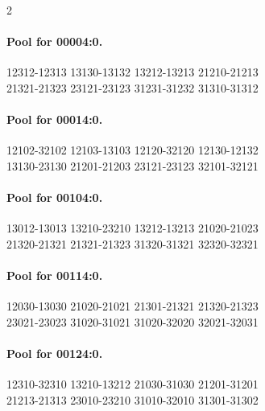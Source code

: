 \begin{multicols}{2}
\paragraph{Pool for 00004:0.}
\begingroup\footnotesize\ttfamily\begin{flushleft}
12312-12313 13130-13132 13212-13213 21210-21213\\
21321-21323 23121-23123 31231-31232 31310-31312\\
\end{flushleft}\endgroup
\paragraph{Pool for 00014:0.}
\begingroup\footnotesize\ttfamily\begin{flushleft}
12102-32102 12103-13103 12120-32120 12130-12132\\
13130-23130 21201-21203 23121-23123 32101-32121\\
\end{flushleft}\endgroup
\paragraph{Pool for 00104:0.}
\begingroup\footnotesize\ttfamily\begin{flushleft}
13012-13013 13210-23210 13212-13213 21020-21023\\
21320-21321 21321-21323 31320-31321 32320-32321\\
\end{flushleft}\endgroup
\paragraph{Pool for 00114:0.}
\begingroup\footnotesize\ttfamily\begin{flushleft}
12030-13030 21020-21021 21301-21321 21320-21323\\
23021-23023 31020-31021 31020-32020 32021-32031\\
\end{flushleft}\endgroup
\paragraph{Pool for 00124:0.}
\begingroup\footnotesize\ttfamily\begin{flushleft}
12310-32310 13210-13212 21030-31030 21201-31201\\
21213-21313 23010-23210 31010-32010 31301-31302\\
\end{flushleft}\endgroup

\end{multicols}
